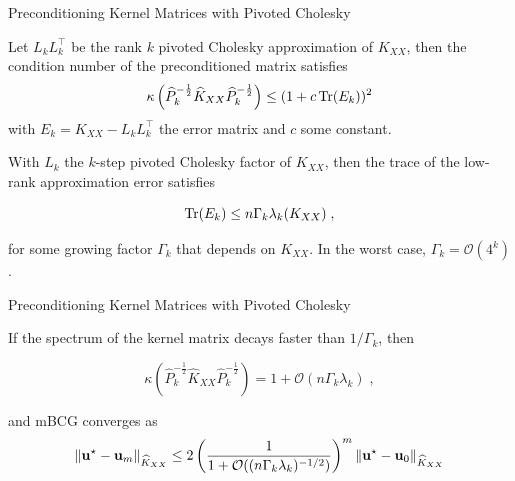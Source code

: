 \documentclass{beamer}
\begin{document}
\begin{frame}{Preconditioning Kernel Matrices with Pivoted Cholesky}
\begin{proposition}
Let $L_kL_k^\top$ be the rank $k$ pivoted Cholesky approximation of $K_{XX}$, then the condition number of the preconditioned matrix satisfies
{\small
\begin{equation*}
    \kappa \left( \widehat P_k^{-\frac 1 2} \widehat K_{XX} \widehat P_k^{-\frac 1 2} \right) \le (1 + c \operatorname{Tr}(E_k) )^2
\end{equation*}}
with $E_k = K_{XX} - L_kL_k^\top$ the error matrix and $c$ some constant.
\end{proposition}
\pause
\begin{theorem}
With $L_k$ the $k$-step pivoted Cholesky factor of $K_{XX}$, then the trace of the low-rank approximation error satisfies

\begin{equation*}
    \operatorname{Tr}(E_k) \le n \Gamma_k \lambda_k(K_{XX}) \;,
\end{equation*}

for some growing factor $\Gamma_k$ that depends on $K_{XX}$. In the worst case, $\Gamma_k = \mathcal O(4^k)$. 

\end{theorem}
\end{frame}

\begin{frame}{Preconditioning Kernel Matrices with Pivoted Cholesky}
\begin{corollary}
If the spectrum of the kernel matrix decays faster than $1/\Gamma_k$, then

\begin{equation*}
    \kappa \left( \widehat P_k^{-\frac 1 2} \widehat K_{XX} \widehat P_k^{-\frac 1 2} \right) = 1 + \mathcal O(n \Gamma_k \lambda_k) \;,
\end{equation*}

and mBCG converges as 
\begin{equation*}
    \Vert \boldsymbol{\mathbf{u}}^\star - \boldsymbol{\mathbf{u}}_m \Vert_{\widehat K_{XX}} \le 2 \left(\frac{1}{1 + \mathcal O((n\Gamma_k\lambda_k)^{-1/2})}\right)^m \Vert \boldsymbol{\mathbf{u}}^\star - \boldsymbol{\mathbf{u}}_0 \Vert_{\widehat K_{XX}}
\end{equation*}

\end{corollary}
\end{frame}
\end{document}
